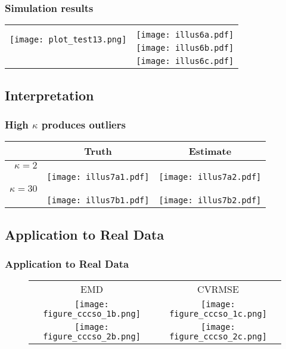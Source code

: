 \documentclass{beamer}
\begin{document}
\begin{frame}
\frametitle{Simulation results}
\begin{center}
\begin{tabular}{cc}
\multirow{3}{*}{\texttt{[image: plot\_test13.png]}} & \\
& \texttt{[image: illus6a.pdf]}\\
& \texttt{[image: illus6b.pdf]}\\
& \texttt{[image: illus6c.pdf]}
\end{tabular}
\end{center}
\end{frame}

\subsection{Interpretation}

\begin{frame}
\frametitle{High $\kappa$ produces outliers}
\begin{center}
\begin{tabular}{r|cc}
& Truth & Estimate\\\hline
$\kappa = 2$ &  & \\
& \texttt{[image: illus7a1.pdf]} & \texttt{[image: illus7a2.pdf]}\\\hline
$\kappa = 30$ &  & \\
& \texttt{[image: illus7b1.pdf]} & \texttt{[image: illus7b2.pdf]}
\end{tabular}
\end{center}
\end{frame}

\subsection{Application to Real Data}

\begin{frame}
\frametitle{Application to Real Data}
\begin{figure}[htbp]
\centering
\begin{tabular}{cc}
EMD & CVRMSE\\
\texttt{[image: figure\_cccso\_1b.png]} &
\texttt{[image: figure\_cccso\_1c.png]}
\\
\texttt{[image: figure\_cccso\_2b.png]} &
\texttt{[image: figure\_cccso\_2c.png]}
\end{tabular}
\label{fig:cvemd}
\end{figure}
\end{frame}
\end{document}
